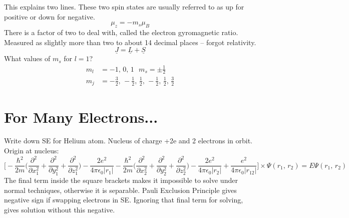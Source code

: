 \documentclass[a4paper, 11pt, normalem]{report}
\begin{document}
This explains two lines.
These two spin states are usually referred to as up for positive or down for negative.
\begin{equation}
    \mu_{z} = -m_{s}\mu_{B}
\end{equation}
There is a factor of two to deal with, called the electron gyromagnetic ratio.
Measured as slightly more than two to about 14 decimal places -- forgot relativity.
\begin{equation}
    \underline{J} = \underline{L} + \underline{S}
\end{equation}
What values of $m_{s}$ for $l = 1$?
\begin{align}
    m_{l} &= -1,\,0,\,1 ~~~ m_{s} = \pm \frac{1}{2} \\
    m_{j} &= -\frac{3}{2},\,-\frac{1}{2},\,\frac{1}{2},\,-\frac{1}{2},\,\frac{1}{2},\,\frac{3}{2}
\end{align}

\section{For Many Electrons...}
Write down SE for Helium atom.
Nucleus of charge +2e and 2 electrons in orbit.
Origin at nucleus:
\begin{equation}
    \Bigg[-\frac{\hbar^{2}}{2m}\Big(\frac{\partial^{2}}{\partial x_{1}^{2}} + \frac{\partial^{2}}{\partial y_{1}^{2}} + \frac{\partial^{2}}{\partial z_{1}^{2}}\Big) - \frac{2e^{2}}{4\pi\epsilon_{0}|r_{1}|} - \frac{\hbar^{2}}{2m}\Big(\frac{\partial^{2}}{\partial x_{2}^{2}} + \frac{\partial^{2}}{\partial y_{2}^{2}} + \frac{\partial^{2}}{\partial z_{2}^{2}}\Big) - \frac{2e^{2}}{4\pi\epsilon_{0}|r_{2}|} + \frac{e^{2}}{4\pi\epsilon_{0}|r_{12}|}\Bigg] \times \Psi(r_{1},\,r_{2}) = E\Psi(r_{1},\,r_{2})
\end{equation}
The final term inside the square brackets makes it impossible to solve under normal techniques, otherwise it is separable.
Pauli Exclusion Principle gives negative sign if swapping electrons in SE.
Ignoring that final term for solving, gives solution without this negative.
\end{document}
